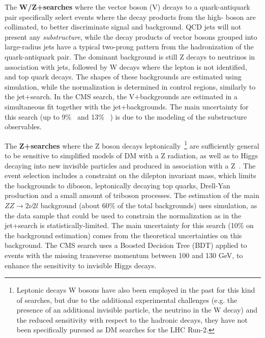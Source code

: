 The \textbf{W/Z+\MET searches} where the vector boson (V) decays to a quark-antiquark pair specifically select events where the decay products from the high-\pt{} boson are collimated, to better discriminate signal and background. QCD jets will not present any \textit{substructure}, while the decay products of vector bosons grouped into large-radius jets have a typical two-prong pattern from the hadronization of the quark-antiquark pair. The dominant background is still Z decays to neutrinos in association with jets, followed by W decays where the lepton is not identified, and top quark decays. The shapes of these backgrounds are estimated using simulation, while the normalization is determined in control regions, similarly to the jet+\MET search. In the CMS search, the V+\MET backgrounds are estimated in a simultaneous fit together with the jet+\MET backgrounds. The main uncertainty for this search (up to 9\%~\cite{Sirunyan:2017jix} and 13\%~\cite{Aaboud:2016qgg} %
) is due to the modeling of the substructure observables. 
\begin{marginnote}[]
\end{marginnote}
The \textbf{Z+\MET searches} where the Z boson decays leptonically~\footnote{Leptonic decays W bosons have also been employed in the past for this kind of searches, but due to the additional experimental challenges (e.g. the presence of an additional invisible particle, the neutrino in the W decay) and the reduced sensitivity with respect to the hadronic decays, they have not been specifically pursued as DM searches for the LHC Run-2.} are sufficiently general to be sensitive to simplified models of DM with a Z radiation, as well as to Higgs decaying into new invisible particles and produced in association with a Z~\cite{Sirunyan:2017qfc, Aaboud:2017bja}. The event selection includes a constraint on the dilepton invariant mass, which limits the backgrounds to diboson, leptonically decaying top quarks, Drell-Yan production and a small amount of triboson processes. The estimation of the main $ZZ\rightarrow 2\nu 2l$ background (about 60\% of the total backgrounds) uses simulation, as the data sample that could be used to constrain the normalization as in the jet+\MET search is statistically-limited. The main uncertainty for this search (10\% on the background estimation) comes from the theoretical uncertainties on this background. The CMS search uses a Boosted Decision Tree (BDT) applied to events with the missing transverse momentum between 100 and 130 GeV, to enhance the sensitivity to invisible Higgs decays. 

